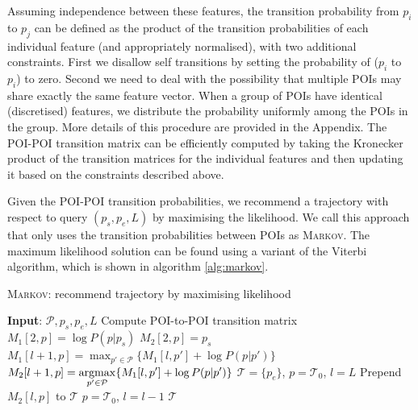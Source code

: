 Assuming independence between these features,
the transition probability from $p_i$ to $p_j$ can be defined as the product
of the transition probabilities of each individual feature (and appropriately normalised),
with two additional constraints.
First we disallow self transitions by setting the probability of ($p_i$ to $p_i$) to zero.
Second we need to deal with the possibility that multiple POIs may share exactly the same
feature vector.
When a group of POIs have identical (discretised) features, we distribute the probability
uniformly among the POIs in the group. More details of this procedure are provided in the Appendix.
The POI-POI transition matrix can be efficiently computed by taking the Kronecker product of 
the transition matrices for the individual features and then updating it based on the constraints described above.

Given the POI-POI transition probabilities, we recommend a trajectory with respect to query
$(p_s, p_e, L)$ by maximising the likelihood. We call this approach that only uses the
transition probabilities between POIs as \textsc{Markov}. The maximum likelihood solution
can be found using a variant of the Viterbi algorithm, which is shown in algorithm \ref{alg:markov}.



\begin{algorithm}
\caption{\textsc{Markov}: recommend trajectory by maximising likelihood}
\label{alg:markov}
\begin{algorithmic}[1]
\STATE \textbf{Input}: $\mathcal{P}, p_s, p_e, L$
\STATE Compute POI-to-POI transition matrix
    \STATE $M_1[2, p] = \log P(p|p_s)$
    \STATE $M_2[2, p] = p_s$
\ENDFOR
{}
        \STATE \(\displaystyle M_1[l+1, p] = \max_{p' \in \mathcal{P}} \{ M_1[l, p'] + \log P(p|p') \} \) 
        \STATE \(\displaystyle M_2[l+1, p] = \operatorname*{argmax}_{p' \in \mathcal{P}} \{ M_1[l, p'] + \log P(p|p') \} \)
    \ENDFOR
\ENDFOR
\STATE $\mathcal{T} = \{p_e\}$, $p = \mathcal{T}_0$, $l = L$
\REPEAT
    \STATE Prepend $M_2[l, p]$ to $\mathcal{T}$
    \STATE $p = \mathcal{T}_0$, $l = l - 1$
\RETURN $\mathcal{T}$
\end{algorithmic}
\end{algorithm}



